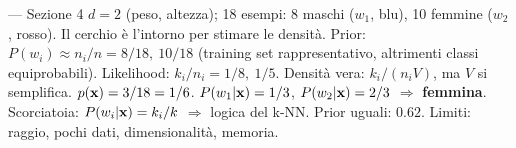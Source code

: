 \begin{appunti}{— Sezione 4}
 $d=2$ (peso, altezza); 18 esempi: 8 maschi ($w_1$, blu), 10 femmine ($w_2$, rosso). Il cerchio è l'intorno per stimare le densità.
 Prior: $P(w_i)\approx n_i/n=8/18,\ 10/18$ (training set rappresentativo, altrimenti classi equiprobabili). Likelihood: $k_i/n_i=1/8,\ 1/5$. Densità vera: $k_i/(n_iV)$, ma $V$ si semplifica. $p(\mathbf{x})=3/18=1/6$.
 $P(w_1|\mathbf{x})=1/3$, $P(w_2|\mathbf{x})=2/3$ $\Rightarrow$ \textbf{femmina}. Scorciatoia: $P(w_i|\mathbf{x})=k_i/k$ $\Rightarrow$ logica del k-NN. Prior uguali: $0.62$. Limiti: raggio, pochi dati, dimensionalità, memoria.
\end{appunti}
